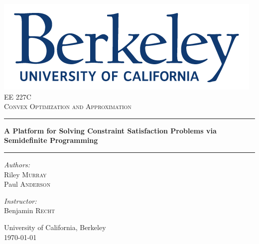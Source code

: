 \documentclass[12pt]{article} %
\begin{document}
\begin{titlepage}
	
	\begin{center}
		\vspace{10cm}
		
		\includegraphics[width=.5\textwidth]{./images/primarylogo}\\[3cm]    
		
		\normalsize EE 227C\\
		\textsc{\large Convex Optimization and Approximation}\\[1cm]		
		
		\hrule 
		\vspace{1 cm}
		{ \Large \textbf{A Platform for Solving Constraint Satisfaction Problems via Semidefinite Programming}\\[0.5cm]
			\vspace{0.5 cm}
			\hrule
			\vspace{1.5 cm}
			
			\begin{minipage}[t]{0.4\textwidth}
				\begin{flushleft} \large
					\emph{Authors:}\\
					\vspace{0.7ex}
					Riley \textsc{Murray} \\
					Paul \textsc{Anderson}
					
				\end{flushleft}
			\end{minipage}
			\begin{minipage}[t]{0.4\textwidth}
				\begin{flushright} \large
					\emph{Instructor:} \\
					\vspace{0.7ex}
					Benjamin \textsc{Recht}\\[0.3 cm]
				\end{flushright}
			\end{minipage}
			\vfill 
			University of California, Berkeley\\[.5cm]
			\large \today}
		
	\end{center}
	
\end{titlepage}
\end{document}
